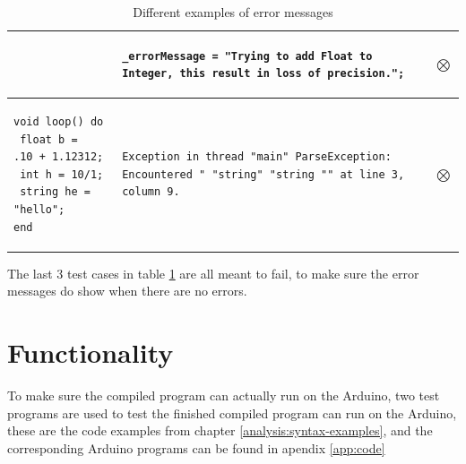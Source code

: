 \begin{table}[thp]
\begin{tabular}{|l|m{10cm}|c|}
{\begin{lstlisting}[numbers=none,frame=none,resetmargins=true]
\end{lstlisting}} &
{\begin{lstlisting}[numbers=none,frame=none,resetmargins=true,language={}]
_errorMessage = "Trying to add Float to Integer, this result in loss of precision.";
\end{lstlisting}} &
$\bigotimes$\\
\hline
{\begin{lstlisting}[numbers=none,frame=none,resetmargins=true]
void loop() do
 float b =  .10 + 1.12312;
 int h = 10/1;
 string he = "hello";
end
\end{lstlisting}} &
{\begin{lstlisting}[numbers=none,frame=none,resetmargins=true,language={}]
Exception in thread "main" ParseException: Encountered " "string" "string "" at line 3, column 9.
\end{lstlisting}} &
$\bigotimes$\\
\hline
\end{tabular}
\caption{Different examples of error messages}
\label{tab:type_test}
\end{table}

The last 3 test cases in table \ref{tab:type_test} are all meant to fail, to make sure the error messages do show when there are no errors.

\section{Functionality}
To make sure the compiled program can actually run on the Arduino, two test programs are used to test the finished compiled program can run on the Arduino, these are the code examples from chapter \ref{analysis:syntax-examples}, and the corresponding Arduino programs can be found in apendix \ref{app:code}\pagebreak
